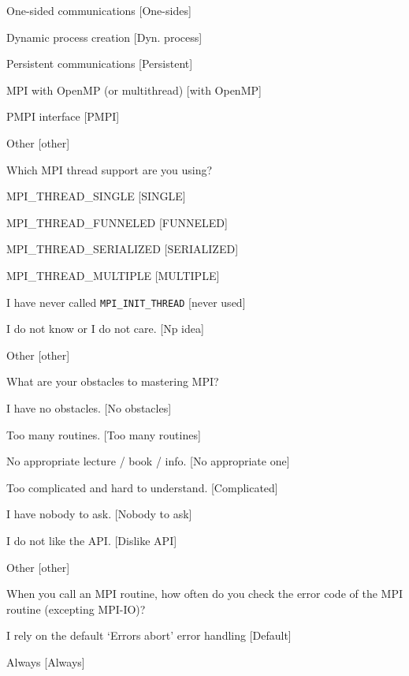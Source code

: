 \documentclass[conference,10pt,letterpaper]{IEEEtran}
\begin{document}
{{\begin{description}
\begin{inparaenum}[{\bf C}1)]
    \item One-sided communications [One-sides]
    \item Dynamic process creation [Dyn. process]
    \item Persistent communications [Persistent]
    \item MPI with OpenMP (or multithread) [with OpenMP]
    \item PMPI interface [PMPI]
    \item Other [other]
    \end{inparaenum}
  \item[Q18*:] Which MPI thread support are you using?
    \begin{inparaenum}[{\bf C}1)]
    \item MPI\_THREAD\_SINGLE [SINGLE]
    \item MPI\_THREAD\_FUNNELED [FUNNELED]
    \item MPI\_THREAD\_SERIALIZED [SERIALIZED] 
    \item MPI\_THREAD\_MULTIPLE [MULTIPLE]
    \item I have never called {\tt MPI\_INIT\_THREAD} [never used]
    \item I do not know or I do not care. [Np idea]
    \item Other [other]
    \end{inparaenum}
  \item[Q19*:] What are your obstacles to mastering MPI?
    \begin{inparaenum}[{\bf C}1)]
    \item I have no obstacles. [No obstacles]
    \item Too many routines. [Too many routines]
    \item No appropriate lecture / book / info. [No appropriate one]
    \item Too complicated and hard to understand. [Complicated]
    \item I have nobody to ask. [Nobody to ask]
    \item I do not like the API. [Dislike API]
    \item Other [other]
    \end{inparaenum}
  \item[Q20:] When you call an MPI routine, how often do you check the error code of the MPI routine  (excepting MPI-IO)?
    \begin{inparaenum}[{\bf C}1)]
    \item I rely on the default ‘Errors abort’ error handling [Default]
    \item Always [Always]

\end{inparaenum}
\end{description}}}
\end{document}
